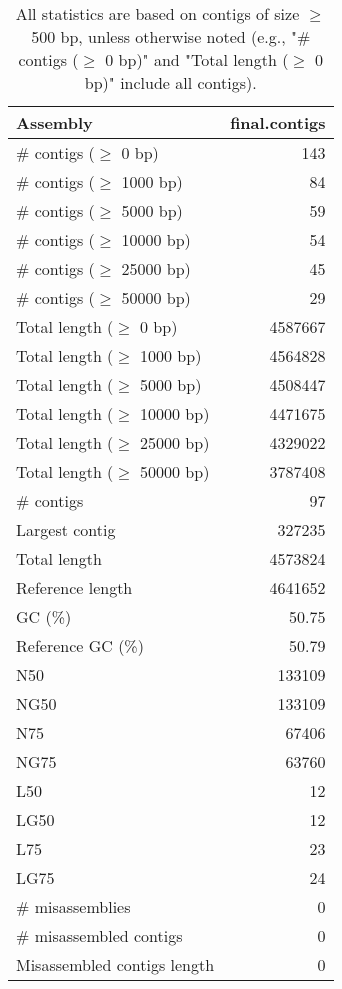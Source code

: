 \documentclass[12pt,a4paper]{article}
\begin{document}
\begin{table}[ht]
\begin{center}
\caption{All statistics are based on contigs of size $\geq$ 500 bp, unless otherwise noted (e.g., "\# contigs ($\geq$ 0 bp)" and "Total length ($\geq$ 0 bp)" include all contigs).}
\begin{tabular}{|l*{1}{|r}|}
\hline
Assembly & final.contigs \\ \hline
\# contigs ($\geq$ 0 bp) & 143 \\ \hline
\# contigs ($\geq$ 1000 bp) & 84 \\ \hline
\# contigs ($\geq$ 5000 bp) & 59 \\ \hline
\# contigs ($\geq$ 10000 bp) & 54 \\ \hline
\# contigs ($\geq$ 25000 bp) & 45 \\ \hline
\# contigs ($\geq$ 50000 bp) & 29 \\ \hline
Total length ($\geq$ 0 bp) & 4587667 \\ \hline
Total length ($\geq$ 1000 bp) & 4564828 \\ \hline
Total length ($\geq$ 5000 bp) & 4508447 \\ \hline
Total length ($\geq$ 10000 bp) & 4471675 \\ \hline
Total length ($\geq$ 25000 bp) & 4329022 \\ \hline
Total length ($\geq$ 50000 bp) & 3787408 \\ \hline
\# contigs & 97 \\ \hline
Largest contig & 327235 \\ \hline
Total length & 4573824 \\ \hline
Reference length & 4641652 \\ \hline
GC (\%) & 50.75 \\ \hline
Reference GC (\%) & 50.79 \\ \hline
N50 & 133109 \\ \hline
NG50 & 133109 \\ \hline
N75 & 67406 \\ \hline
NG75 & 63760 \\ \hline
L50 & 12 \\ \hline
LG50 & 12 \\ \hline
L75 & 23 \\ \hline
LG75 & 24 \\ \hline
\# misassemblies & 0 \\ \hline
\# misassembled contigs & 0 \\ \hline
Misassembled contigs length & 0 \\ \hline

\end{tabular}
\end{center}
\end{table}
\end{document}
